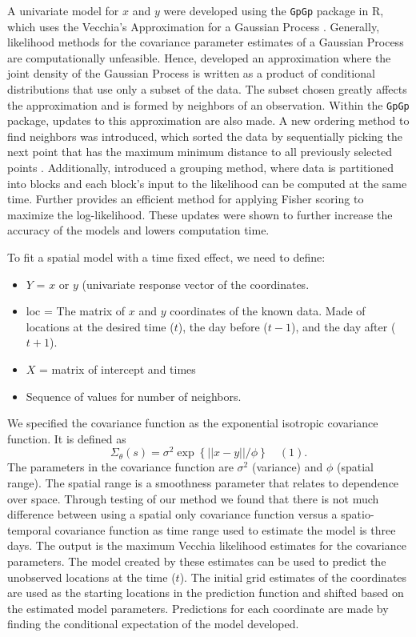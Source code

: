 \documentclass[12pt]{article}
\providecommand{\tightlist}{%
  \setlength{\itemsep}{0pt}\setlength{\parskip}{0pt}}
\begin{document}
A univariate model for \(x\) and \(y\) were developed using the
\texttt{GpGp} package in R, which uses the Vecchia's Approximation for a
Gaussian Process \citep{gpgp_pkg}. Generally, likelihood methods for the
covariance parameter estimates of a Gaussian Process are computationally
unfeasible. Hence, \citet{vecchia1988estimation} developed an
approximation where the joint density of the Gaussian Process is written
as a product of conditional distributions that use only a subset of the
data. The subset chosen greatly affects the approximation and is formed
by neighbors of an observation. Within the \texttt{GpGp} package,
updates to this approximation are also made. A new ordering method to
find neighbors was introduced, which sorted the data by sequentially
picking the next point that has the maximum minimum distance to all
previously selected points \citep{guinness_permutation_2018}.
Additionally, \citet{guinness_permutation_2018} introduced a grouping
method, where data is partitioned into blocks and each block's input to
the likelihood can be computed at the same time. Further
\citet{guinness_gaussian_2019} provides an efficient method for applying
Fisher scoring to maximize the log-likelihood. These updates were shown
to further increase the accuracy of the models and lowers computation
time.

To fit a spatial model with a time fixed effect, we need to define:

\begin{itemize}
\tightlist
\item
  \(Y\) = \(x\) or \(y\) (univariate response vector of the coordinates.
\item
  loc = The matrix of \(x\) and \(y\) coordinates of the known data.
  Made of locations at the desired time (\(t\)), the day before
  (\(t-1\)), and the day after (\(t+1\)).
\item
  \(X\) = matrix of intercept and times
\item
  Sequence of values for number of neighbors.
\end{itemize}

We specified the covariance function as the exponential isotropic
covariance function. It is defined as
\[\Sigma_{\theta}(s) = \sigma^2\exp\left\{||x-y||/\phi\right\} \quad (1).\]
The parameters in the covariance function are \(\sigma^2\) (variance)
and \(\phi\) (spatial range). The spatial range is a smoothness
parameter that relates to dependence over space. Through testing of our
method we found that there is not much difference between using a
spatial only covariance function versus a spatio-temporal covariance
function as time range used to estimate the model is three days. The
output is the maximum Vecchia likelihood estimates for the covariance
parameters. The model created by these estimates can be used to predict
the unobserved locations at the time (\(t\)). The initial grid estimates
of the coordinates are used as the starting locations in the prediction
function and shifted based on the estimated model parameters.
Predictions for each coordinate are made by finding the conditional
expectation of the model developed.
\end{document}
